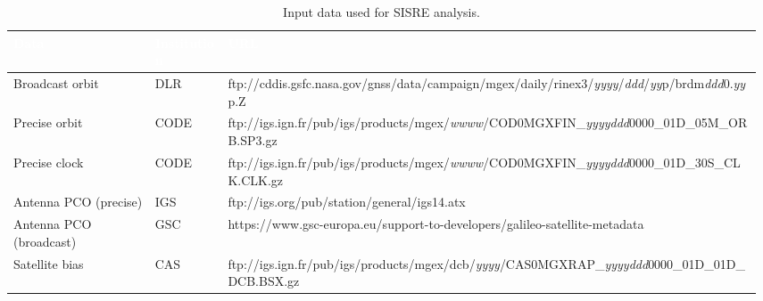 \documentclass{beamer}
\begin{document}
\begin{frame}[t]
\begin{columns}
\begin{column}[t]{.68\textwidth}
      \begin{alertblock}{}
           \begin{table}
              \color{black}
              \caption{Input data used for SISRE analysis.}
              \label{tab:data}
              \begin{tabular}{lll}
              \hline
              \rowcolor{kvgreen}\textcolor{white}{\textbf{Data}} & \textcolor{white}{\textbf{Institution  }} & \textcolor{white}{\textbf{URL}}\\
              \hline
              Broadcast orbit & DLR & ftp://cddis.gsfc.nasa.gov/gnss/data/campaign/mgex/daily/rinex3/\textit{yyyy}/\textit{ddd}/\textit{yy}p/brdm\textit{ddd}0.\textit{yy}p.Z\\
              Precise orbit & CODE & ftp://igs.ign.fr/pub/igs/products/mgex/\textit{wwww}/COD0MGXFIN\_\textit{yyyyddd}0000\_01D\_05M\_ORB.SP3.gz\\
              Precise clock & CODE & ftp://igs.ign.fr/pub/igs/products/mgex/\textit{wwww}/COD0MGXFIN\_\textit{yyyyddd}0000\_01D\_30S\_CLK.CLK.gz\\
              Antenna PCO (precise) & IGS & ftp://igs.org/pub/station/general/igs14.atx \\
              Antenna PCO (broadcast) & GSC & https://www.gsc-europa.eu/support-to-developers/galileo-satellite-metadata \\
                            
              Satellite bias & CAS & ftp://igs.ign.fr/pub/igs/products/mgex/dcb/\textit{yyyy}/CAS0MGXRAP\_\textit{yyyyddd}0000\_01D\_01D\_DCB.BSX.gz\\
              \hline
              \end{tabular}
           \end{table}
      \end{alertblock} 
    \end{column}

    \begin{column}[t]{.28\textwidth}


\end{column}
\end{columns}
\end{frame}
\end{document}
